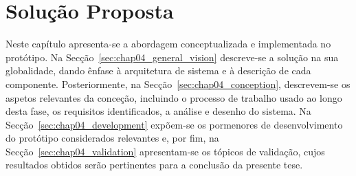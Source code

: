 \chapter{Solução Proposta}
\label{chap:Chapter4}
Neste capítulo apresenta-se a abordagem conceptualizada e implementada no protótipo. Na Secção~\ref{sec:chap04_general_vision} descreve-se a solução na sua globalidade, dando ênfase à arquitetura de sistema e à descrição de cada componente. Posteriormente, na Secção~\ref{sec:chap04_conception}, descrevem-se os aspetos relevantes da conceção, incluindo o processo de trabalho usado ao longo desta fase, os requisitos identificados, a análise e desenho do sistema. Na Secção~\ref{sec:chap04_development} expõem-se os pormenores de desenvolvimento do protótipo considerados relevantes e, por fim, na Secção~\ref{sec:chap04_validation} apresentam-se os tópicos de validação, cujos resultados obtidos serão pertinentes para a conclusão da presente tese.







%

%

